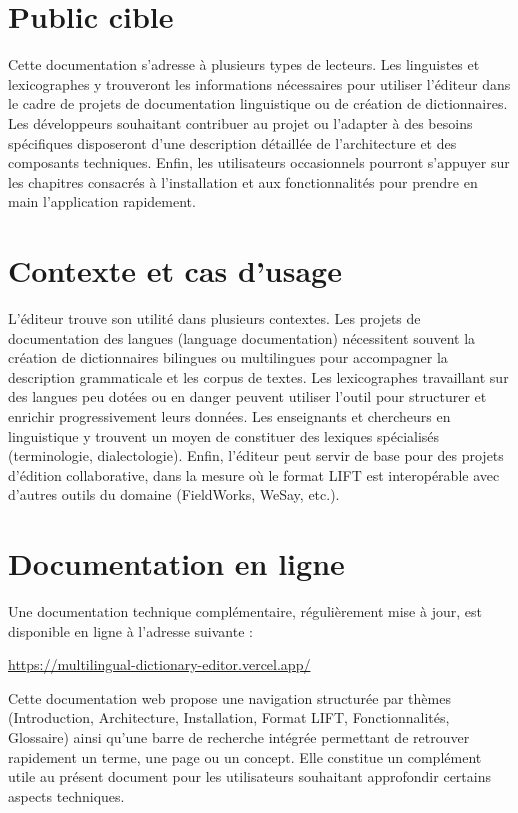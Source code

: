 \documentclass[11pt,twoside,openany]{book}
\begin{document}
\section{Public cible}

Cette documentation s'adresse à plusieurs types de lecteurs. Les linguistes et lexicographes y trouveront les informations nécessaires pour utiliser l'éditeur dans le cadre de projets de documentation linguistique ou de création de dictionnaires. Les développeurs souhaitant contribuer au projet ou l'adapter à des besoins spécifiques disposeront d'une description détaillée de l'architecture et des composants techniques. Enfin, les utilisateurs occasionnels pourront s'appuyer sur les chapitres consacrés à l'installation et aux fonctionnalités pour prendre en main l'application rapidement.

\section{Contexte et cas d'usage}

L'éditeur trouve son utilité dans plusieurs contextes. Les projets de documentation des langues (language documentation) nécessitent souvent la création de dictionnaires bilingues ou multilingues pour accompagner la description grammaticale et les corpus de textes. Les lexicographes travaillant sur des langues peu dotées ou en danger peuvent utiliser l'outil pour structurer et enrichir progressivement leurs données. Les enseignants et chercheurs en linguistique y trouvent un moyen de constituer des lexiques spécialisés (terminologie, dialectologie). Enfin, l'éditeur peut servir de base pour des projets d'édition collaborative, dans la mesure où le format LIFT est interopérable avec d'autres outils du domaine (FieldWorks, WeSay, etc.).

\section{Documentation en ligne}

Une documentation technique complémentaire, régulièrement mise à jour, est disponible en ligne à l'adresse suivante :

\url{https://multilingual-dictionary-editor.vercel.app/}

Cette documentation web propose une navigation structurée par thèmes (Introduction, Architecture, Installation, Format LIFT, Fonctionnalités, Glossaire) ainsi qu'une barre de recherche intégrée permettant de retrouver rapidement un terme, une page ou un concept. Elle constitue un complément utile au présent document pour les utilisateurs souhaitant approfondir certains aspects techniques.
\end{document}
